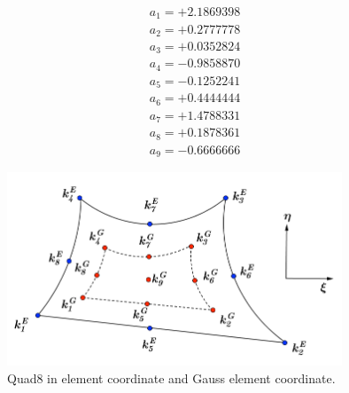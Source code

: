\begin{align*}
a_1 = +2.1869398 \\
a_2 = +0.2777778 \\
a_3 = +0.0352824 \\
a_4 = -0.9858870 \\
a_5 = -0.1252241 \\
a_6 = +0.4444444 \\
a_7 = +1.4788331 \\
a_8 = +0.1878361 \\
a_9 = -0.6666666
\end{align*}



\begin{figure}[h]
	\begin{center}
		\includegraphics[width=10cm,clip]{Quad8_1.pdf}			
		\caption{Quad8 in element coordinate and Gauss element coordinate.} \label{fig: Quad8_1}
	\end{center} 
\end{figure}

